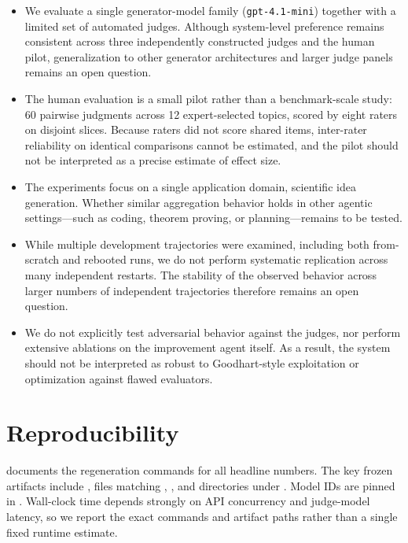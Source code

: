 \documentclass{article}
\begin{document}
\begin{itemize}

\item We evaluate a single generator-model family (\texttt{gpt-4.1-mini}) together with a limited set of automated judges. Although system-level preference remains consistent across three independently constructed judges and the human pilot, generalization to other generator architectures and larger judge panels remains an open question.

\item The human evaluation is a small pilot rather than a benchmark-scale study: 60 pairwise judgments across 12 expert-selected topics, scored by eight raters on disjoint slices. Because raters did not score shared items, inter-rater reliability on identical comparisons cannot be estimated, and the pilot should not be interpreted as a precise estimate of effect size.

\item The experiments focus on a single application domain, scientific idea generation. Whether similar aggregation behavior holds in other agentic settings—such as coding, theorem proving, or planning—remains to be tested.

\item While multiple development trajectories were examined, including both from-scratch and rebooted runs, we do not perform systematic replication across many independent restarts. The stability of the observed behavior across larger numbers of independent trajectories therefore remains an open question.

\item We do not explicitly test adversarial behavior against the judges, nor perform extensive ablations on the improvement agent itself. As a result, the system should not be interpreted as robust to Goodhart-style exploitation or optimization against flawed evaluators.

\end{itemize}

\section{Reproducibility}

 documents the regeneration commands for all headline numbers. The key frozen artifacts include , files matching , , and directories under . Model IDs are pinned in . Wall-clock time depends strongly on API concurrency and judge-model latency, so we report the exact commands and artifact paths rather than a single fixed runtime estimate.


\begingroup
\small


\endgroup
\end{document}
